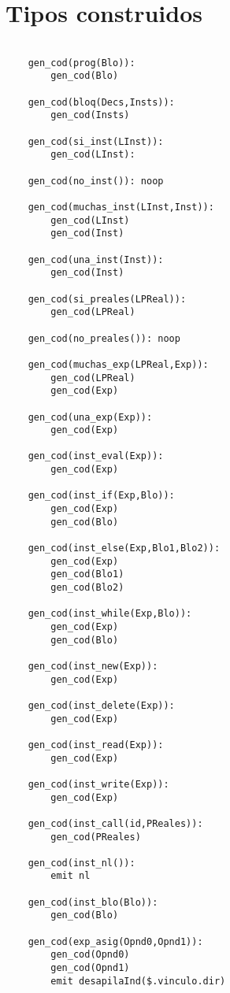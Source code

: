 
\section{Tipos construidos}

\begin{lstlisting}

    gen_cod(prog(Blo)):
        gen_cod(Blo)

    gen_cod(bloq(Decs,Insts)):
        gen_cod(Insts)

    gen_cod(si_inst(LInst)):
        gen_cod(LInst):

    gen_cod(no_inst()): noop

    gen_cod(muchas_inst(LInst,Inst)):
        gen_cod(LInst)
        gen_cod(Inst)

    gen_cod(una_inst(Inst)):
        gen_cod(Inst)

    gen_cod(si_preales(LPReal)):
        gen_cod(LPReal)

    gen_cod(no_preales()): noop

    gen_cod(muchas_exp(LPReal,Exp)):
        gen_cod(LPReal)
        gen_cod(Exp)

    gen_cod(una_exp(Exp)):
        gen_cod(Exp)

    gen_cod(inst_eval(Exp)):
        gen_cod(Exp)

    gen_cod(inst_if(Exp,Blo)):
        gen_cod(Exp)
        gen_cod(Blo)

    gen_cod(inst_else(Exp,Blo1,Blo2)):
        gen_cod(Exp)
        gen_cod(Blo1)
        gen_cod(Blo2)

    gen_cod(inst_while(Exp,Blo)):
        gen_cod(Exp)
        gen_cod(Blo)

    gen_cod(inst_new(Exp)):
        gen_cod(Exp)

    gen_cod(inst_delete(Exp)):
        gen_cod(Exp)

    gen_cod(inst_read(Exp)):
        gen_cod(Exp)

    gen_cod(inst_write(Exp)):
        gen_cod(Exp)

    gen_cod(inst_call(id,PReales)):
        gen_cod(PReales)

    gen_cod(inst_nl()):
        emit nl

    gen_cod(inst_blo(Blo)):
        gen_cod(Blo)

    gen_cod(exp_asig(Opnd0,Opnd1)):
        gen_cod(Opnd0)
        gen_cod(Opnd1)
        emit desapilaInd($.vinculo.dir)


\end{lstlisting}
